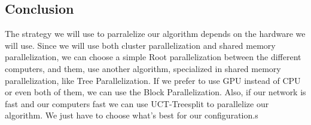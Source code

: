 \subsection{Conclusion}

The strategy we will use to parralelize our algorithm depends on the hardware we will use. Since we will use both cluster parallelization and shared memory parallelization, we can choose a simple Root parallelization between the different computers, and them, use another algorithm, specialized in shared memory parallelization, like Tree Parallelization. If we prefer to use GPU instead of CPU or even both of them, we can use the Block Parallelization. Also, if our network is fast and our computers fast we can use UCT-Treesplit to parallelize our algorithm. We just have to choose what's best for our configuration.s
